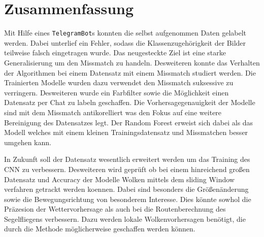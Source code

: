 \section{Zusammenfassung}
\label{sec:05_zusammenfassung}
Mit Hilfe eines \texttt{TelegramBot}s konnten die selbst aufgenommen
Daten gelabelt werden.
Dabei unterlief ein Fehler, sodass die Klassenzugehörigkeit der Bilder teilweise
falsch eingetragen wurde.
Das neugesteckte Ziel ist eine starke Generalisierung um den 
Missmatch zu handeln.
Desweiteren konnte das Verhalten der Algorithmen bei einem Datensatz
mit einem Missmatch studiert werden.
Die Trainierten Modelle wurden dazu verwendet den Missmatch 
suksessive zu verringern.
Desweiteren wurde ein Farbfilter sowie die Möglichkeit einen 
Datensatz per Chat zu labeln geschaffen.
Die Vorhersagegenauigkeit der Modelle sind mit dem Missmatch antikorelliert was
den Fokus auf eine weitere Bereinigung des Datensatzes legt.
Der Random Forest erweist sich dabei als das Modell welches mit 
einem kleinen Trainingsdatensatz und Missmatchen besser umgehen 
kann.

In Zukunft soll der Datensatz wesentlich erweitert werden um das 
Training des CNN zu verbessern.
Desweiteren wird geprüft ob bei einem hinreichend großen Datensatz und Accuracy
der Modelle Wolken mittels dem sliding Window verfahren getrackt werden koennen.
Dabei sind besonders die Größenänderung sowie die Bewegungsrichtung von
besonderem Interesse.
Dies könnte sowhol die Präzesion der Wettervorhersage als auch bei
die Routenberechnung des Segelfliegens verbessern. 
Dazu werden lokale Wolkenvorhersagen benötigt, die durch die Methode
möglicherweise geschaffen werden können.
